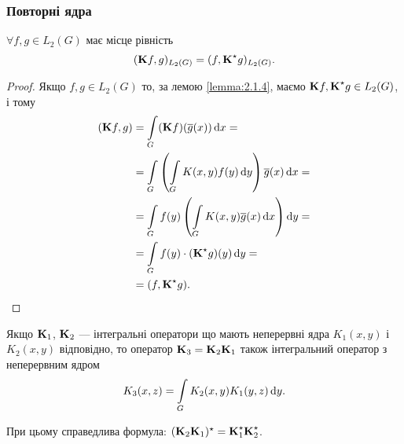 \allowbreak

\subsubsection{Повторні ядра}

\begin{proposition}
	$\forall f, g \in L_2(G)$ має місце рівність 
	\begin{equation}
		(\bf{K}f,g)_{L_2(G)} = (f, \bf{K}^\star g)_{L_2(G)}.
	\end{equation}
\end{proposition}

\begin{proof}
	Якщо $f, g \in L_2(G)$ то, за лемою \ref{lemma:2.1.4}, маємо $\bf{K}f, \bf{K}^\star g \in L_2(G)$, і тому
	\begin{equation}
		\begin{aligned}
			(\bf{K}f, g) &= \Int_G (\bf{K}f)(\overline g(x)) \diff x = \\
			&= \Int_G \left( \Int_G K(x, y) f(y) \diff y\right) \overline{g}(x) \diff x = \\
			&= \Int_G f(y) \left( \Int_G K(x, y) \overline g(x) \diff x\right) \diff y = \\
			&= \Int_G f(y) \cdot (\bf{K}^\star  g)(y) \diff y = \\
			&= (f, \bf{K}^\star g).
		\end{aligned}
	\end{equation}
\end{proof}

\begin{lemma}
	Якщо $\bf{K}_1$, $\bf{K}_2$ --- інтегральні оператори що мають неперервні ядра $K_1(x, y)$ і $K_2(x, y)$ відповідно, то оператор $\bf{K}_3 = \bf{K}_2 \bf{K}_1$ також інтегральний оператор з неперервним ядром
	\begin{equation}
		K_3(x, z) = \Int_G K_2(x, y) K_1(y, z) \diff y.
	\end{equation}
\end{lemma}

\begin{remark}
	При цьому справедлива формула: $(\bf{K}_2 \bf{K}_1)^\star = \bf{K}_1^\star \bf{K}_2^\star$.
\end{remark}

